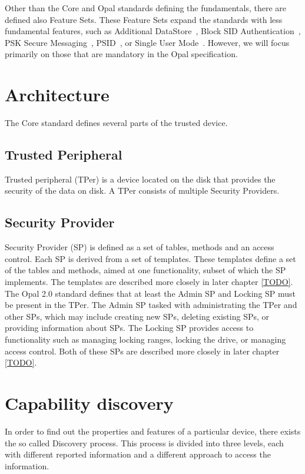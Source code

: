 Other than the Core and Opal standards defining the fundamentals, there are defined also Feature Sets. These Feature Sets expand the standards with less fundamental features, such as Additional DataStore~\cite{TODO}, Block SID Authentication~\cite{TODO}, PSK Secure Messaging~\cite{TODO}, PSID~\cite{TODO}, or Single User Mode~\cite{TODO}. However, we will focus primarily on those that are mandatory in the Opal specification.

\section{Architecture}

The Core standard defines several parts of the trusted device. %

\subsection{Trusted Peripheral}

Trusted peripheral (TPer) is a device located on the disk that provides the security of the data on disk. A TPer consists of multiple Security Providers.

\subsection{Security Provider}

Security Provider (SP) is defined as a set of tables, methods and an access control. Each SP is derived from a set of templates. These templates define a set of the tables and methods, aimed at one functionality, subset of which the SP implements. The templates are described more closely in later chapter \ref{TODO}.
The Opal 2.0 standard defines that at least the Admin SP and Locking SP must be present in the TPer. The Admin SP tasked with administrating the TPer and other SPs, which may include creating new SPs, deleting existing SPs, or providing information about SPs. The Locking SP provides access to functionality such as managing locking ranges, locking the drive, or managing access control. Both of these SPs are described more closely in later chapter \ref{TODO}.

\section{Capability discovery}

In order to find out the properties and features of a particular device, there exists the so called Discovery process. This process is divided into three levels, each with different reported information and a different approach to access the information.

